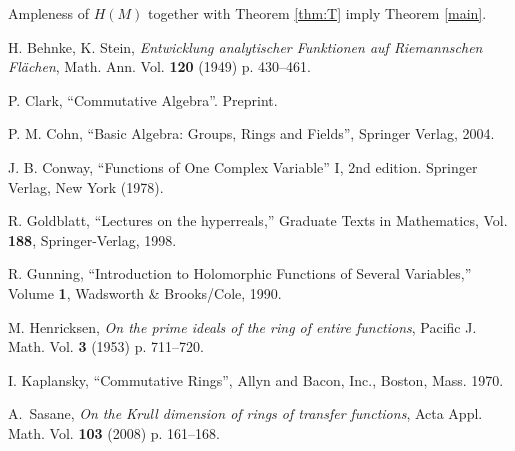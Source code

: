 \documentclass{amsproc}
\theoremstyle{definition}
\theoremstyle{definition}
\theoremstyle{remark}
\begin{document}
\medskip 
Ampleness of $H(M)$ together with Theorem \ref{thm:T} imply Theorem \ref{main}. 

\begin{thebibliography}{BLP05}

H. Behnke, K. Stein, {\em 
Entwicklung analytischer Funktionen auf Riemannschen Fl\"{a}chen}, 
Math. Ann. Vol. {\bf 120} (1949) p. 430--461. 

P. Clark, ``Commutative Algebra''. Preprint. 

P. M. Cohn, ``Basic Algebra: Groups, Rings and Fields'', Springer Verlag,  2004.  

J. B. Conway, ``Functions of One Complex Variable'' I, 2nd edition. Springer Verlag, New York (1978). 

 R. Goldblatt, ``Lectures on the hyperreals,''
Graduate Texts in Mathematics, Vol.  {\bf 188}, Springer-Verlag, 1998. 

R. Gunning, ``Introduction to Holomorphic Functions of Several Variables,'' Volume {\bf 1}, Wadsworth \& Brooks/Cole, 1990. 

M. Henricksen, {\em On the prime ideals of the ring of entire functions}, Pacific J. Math. Vol. {\bf 3} (1953) p. 711--720.

I. Kaplansky, ``Commutative Rings'', Allyn and Bacon, Inc., Boston, Mass. 1970. 

A.\ Sasane, 
{\em On the Krull dimension of rings of transfer functions}, 
Acta Appl. Math. Vol. {\bf 103} (2008) p. 161--168. 

\end{thebibliography}
\end{document}
